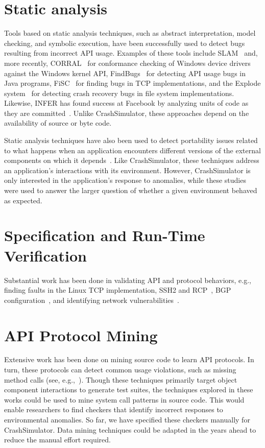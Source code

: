 \section{Static analysis}
Tools based on static analysis techniques, such as abstract interpretation,
model checking, and symbolic execution, have been successfully
used to
detect bugs resulting from incorrect API usage. Examples of these tools
include
SLAM~\cite{Ball_adecade, Ball:2002:SLP:503272.503274} and, more recently,
CORRAL~\cite{DBLP:conf/sigsoft/LalQ14} for conformance checking of Windows
device drivers against the Windows kernel API,
FindBugs~\cite{DBLP:conf/oopsla/HovemeyerP04} for detecting API usage bugs
in Java programs, FiSC~\cite{Musuvathi04modelchecking} for finding bugs in
TCP implementations, and the Explode
system~\cite{Yang:2006:ELG:1298455.1298469} for detecting crash recovery
bugs in file system implementations.  Likewise, INFER has found success at
Facebook by analyzing units of code as they are
committed~\cite{INFERFacebook}. Unlike CrashSimulator, these
approaches depend on the availability of source or byte code.

Static analysis techniques have also been
used to detect portability issues related to what happens when an
application encounters different
versions of the external components on which
it depends~\cite{silakov2010improving, javacompliance-www}. Like
CrashSimulator, these techniques
address an application's interactions with its
environment. However, CrashSimulator is only interested in the application's
response to anomalies,
while  these studies were used to answer the larger question of whether a given
environment behaved as expected.


\section{Specification and Run-Time Verification}
Substantial work has been done in validating API and protocol behaviors,
e.g., finding faults in the Linux TCP implementation, SSH2 and
RCP~\cite{Udrea:2008}, BGP configuration~\cite{Feamster:2005}, and
identifying network vulnerabilities~\cite{ritchey-sp00}.

\section{API Protocol Mining}
Extensive work has been done on mining source code to learn API protocols.
In turn, these protocols can detect
common usage violations, such as missing method calls
(see, e.g.,~\cite{mariani2007compatibility,
DBLP:journals/ase/WasylkowskiZ11, DBLP:conf/icse/PradelJAG12,
DBLP:journals/tosem/MonperrusM13, DBLP:conf/icse/JamrozikSZ16}). Though these
techniques primarily target object component interactions to generate test suites,
the techniques explored in
these works could be used to mine system call patterns in source code.
This would enable researchers
to find checkers that identify incorrect responses to environmental
anomalies. So far, we have specified these checkers manually for
CrashSimulator.  Data mining techniques could be adapted in the years
ahead to reduce the manual effort required.


